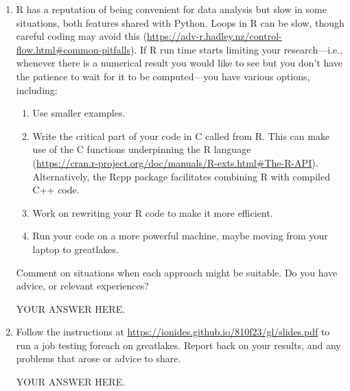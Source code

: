 \documentclass[12pt]{article}
\begin{document}
\begin{enumerate}

\item R has a reputation of being convenient for data analysis but slow in some situations, both features shared with Python. Loops in R can be slow, though careful coding may avoid this (\url{https://adv-r.hadley.nz/control-flow.html#common-pitfalls}). If R run time starts limiting your research---i.e., whenever there is a numerical result you would like to see but you don't have the patience to wait for it to be computed---you have various options, including:
  \begin{enumerate}
  \item Use smaller examples.
  \item Write the critical part of your code in C called from R. This can make use of the C functions underpinning the R language\\
    (\url{https://cran.r-project.org/doc/manuals/R-exts.html#The-R-API}).
    \\
    Alternatively, the Rcpp package facilitates combining R with compiled C++ code.
  \item Work on rewriting your R code to make it more efficient.
  \item Run your code on a more powerful machine, maybe moving from your laptop to greatlakes.
  \end{enumerate}
Comment on situations when each approach might be suitable. Do you have advice, or relevant experiences?
  
  YOUR ANSWER HERE.

\item Follow the instructions at \url{https://ionides.github.io/810f23/gl/slides.pdf} to run a job testing foreach on greatlakes. Report back on your results, and any problems that arose or advice to share.

YOUR ANSWER HERE.
  
\end{enumerate}
\end{document}
